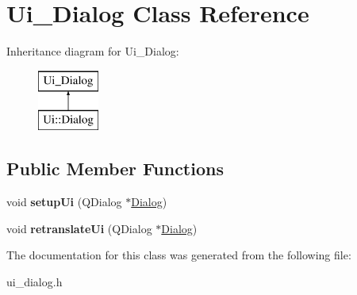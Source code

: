 \hypertarget{classUi__Dialog}{\section{Ui\-\_\-\-Dialog Class Reference}
\label{classUi__Dialog}
}
Inheritance diagram for Ui\-\_\-\-Dialog\-:\begin{figure}[H]
\begin{center}
\leavevmode
\includegraphics[height=2.000000cm]{classUi__Dialog}
\end{center}
\end{figure}
\subsection*{Public Member Functions}
\begin{DoxyCompactItemize}
\item 
\hypertarget{classUi__Dialog_a4f6a478c3ecdafabffb17b39cb26444a}{void {\bfseries setup\-Ui} (Q\-Dialog $\ast$\hyperlink{classDialog}{Dialog})}\label{classUi__Dialog_a4f6a478c3ecdafabffb17b39cb26444a}

\item 
\hypertarget{classUi__Dialog_afa0ccb6f716ca6178260522a193c250e}{void {\bfseries retranslate\-Ui} (Q\-Dialog $\ast$\hyperlink{classDialog}{Dialog})}\label{classUi__Dialog_afa0ccb6f716ca6178260522a193c250e}

\end{DoxyCompactItemize}


The documentation for this class was generated from the following file\-:\begin{DoxyCompactItemize}
\item 
ui\-\_\-dialog.\-h\end{DoxyCompactItemize}
